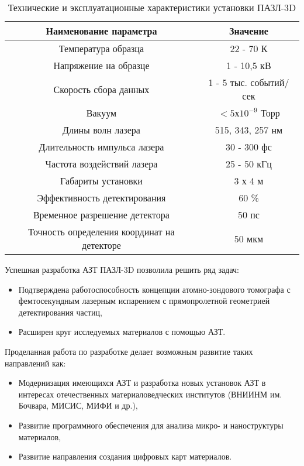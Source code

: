 \begin{table} [htbp]
	\centering
	\caption{Технические и эксплуатационные характеристики установки ПАЗЛ-3D}
	\label{tab:APPLEcharac}
	\begin{SingleSpace}
		\begin{tabular} {| c | c |}
			\hline
			Наименование параметра & Значение  \\ \hline
			Температура образца & 22 - 70 К                \\ \hline
			Напряжение на образце & 1 - 10,5 кВ               \\ \hline
			Скорость сбора данных & 1 - 5 тыс. событий/сек                \\ \hline
			Вакуум & $<5х10^{-9}$ Торр                \\ \hline
			Длины волн лазера & 515, 343, 257 нм               \\ \hline
			Длительность импульса лазера & 30 - 300 фс               \\ \hline
			Частота воздействий лазера & 25 - 50 кГц                \\ \hline
			Габариты установки & 3 х 4 м               \\ \hline
			Эффективность детектирования & 60 \%              \\ \hline
			Временное разрешение детектора & 50 пс               \\ \hline
			Точность определения координат на детекторе  & 50 мкм               \\ \hline
		\end{tabular}
	\end{SingleSpace}
\end{table}
Успешная разработка АЗТ ПАЗЛ-3D позволила решить ряд задач:

\begin{itemize}
	\item Подтверждена работоспособность концепции атомно-зондового томографа с фемтосекундным лазерным испарением с прямопролетной геометрией детектирования частиц,
	\item Расширен круг исследуемых материалов с помощью АЗТ.
\end{itemize}

Проделанная работа по разработке делает возможным развитие таких направлений как:
\begin{itemize}
	\item Модернизация имеющихся АЗТ и разработка новых установок АЗТ в интересах отечественных материаловедческих институтов (ВНИИНМ им. Бочвара, МИСИС, МИФИ  и др.),
	\item Развитие программного обеспечения для анализа микро- и наноструктуры материалов,
	\item Развитие направления создания цифровых карт материалов.
\end{itemize}

\FloatBarrier








